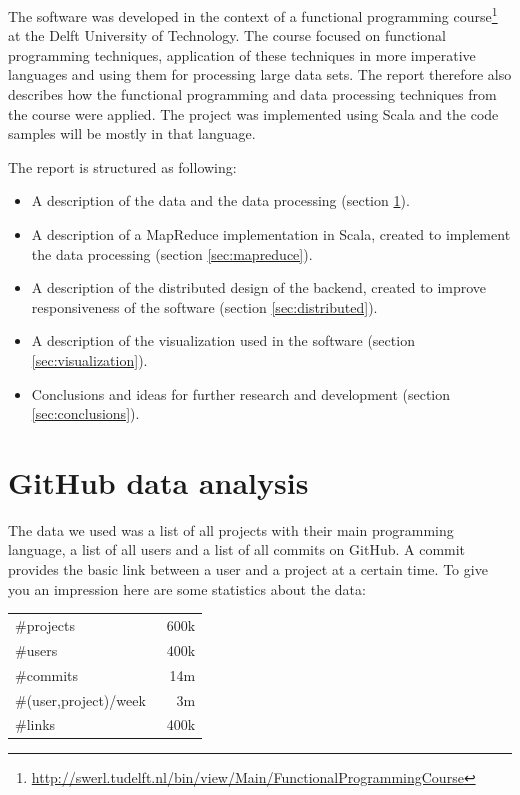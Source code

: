 \documentclass[10pt,a4paper]{article}
\begin{document}
The software was developed in the context of a functional programming course\footnote{\url{http://swerl.tudelft.nl/bin/view/Main/FunctionalProgrammingCourse}} at the Delft University of Technology. The course focused on functional programming techniques, application of these techniques in more imperative languages and using them for processing large data sets. The report therefore also describes how the functional programming and data processing techniques from the course were applied. The project was implemented using Scala and the code samples will be mostly in that language.

The report is structured as following:
\begin{itemize}
    \item A description of the data and the data processing (section \ref{sec:data}).
    \item A description of a MapReduce implementation in Scala, created to implement the data processing (section \ref{sec:mapreduce}).
    \item A description of the distributed design of the backend, created to improve responsiveness of the software (section \ref{sec:distributed}).
    \item A description of the visualization used in the software (section \ref{sec:visualization}).
    \item Conclusions and ideas for further research and development (section \ref{sec:conclusions}).
\end{itemize}

\section{GitHub data analysis}\label{sec:data}

The data we used was a list of all projects with their main programming language, a list of all users and a list of all commits on GitHub. A commit provides the basic link between a user and a project at a certain time. To give you an impression here are some statistics about the data:

\begin{tabular}{l r}
    \hline
    \#projects & ~600k \\
    \#users & ~400k \\
    \#commits & ~14m \\
    \#(user,project)/week & 3m \\
    \#links & 400k \\
    \hline
\end{tabular}
\end{document}
